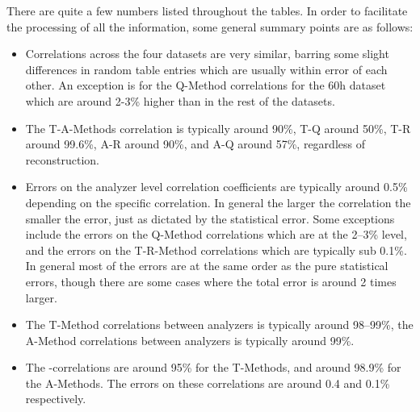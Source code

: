 There are quite a few numbers listed throughout the tables. In order to facilitate the processing of all the information, some general summary points are as follows: 
\begin{itemize}
	\item{Correlations across the four datasets are very similar, barring some slight differences in random table entries which are usually within error of each other. An exception is for the Q-Method correlations for the 60h dataset which are around 2-3\% higher than in the rest of the datasets.}
	\item{The T-A-Methods correlation is typically around 90\%, T-Q around 50\%, T-R around 99.6\%, A-R around 90\%, and A-Q around 57\%, regardless of reconstruction.}
	\item{Errors on the analyzer level correlation coefficients are typically around 0.5\% depending on the specific correlation. In general the larger the correlation the smaller the error, just as dictated by the statistical error. Some exceptions include the errors on the Q-Method correlations which are at the 2--3\% level, and the errors on the T-R-Method correlations which are typically sub 0.1\%. In general most of the errors are at the same order as the pure statistical errors, though there are some cases where the total error is around 2 times larger.}
	\item{The T-Method correlations between \RW analyzers is typically around 98--99\%, the A-Method correlations between \RW analyzers is typically around 99\%.}
	\item{The \RE-\RW correlations are around 95\% for the T-Methods, and around 98.9\% for the A-Methods. The errors on these correlations are around 0.4 and 0.1\% respectively.}
\end{itemize}





